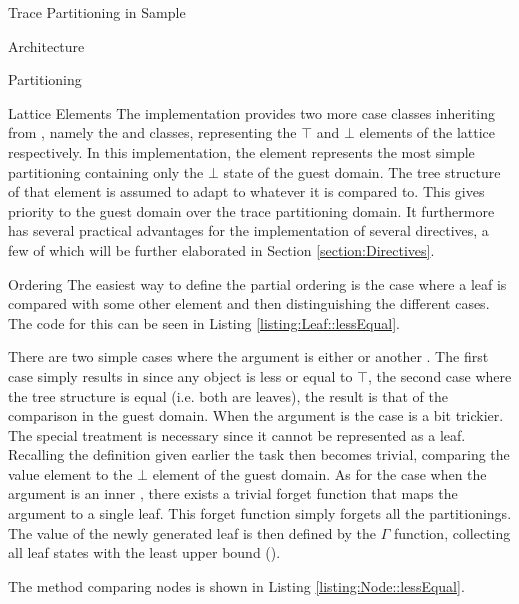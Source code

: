 \begin{chapter}{Trace Partitioning in Sample}
\begin{section}{Architecture}
\begin{subsection}{Partitioning}

			\begin{subsubsection}{Lattice Elements}
				The implementation provides two more case classes inheriting from , namely the  and  classes, representing the $\top$ and $\bot$ elements of the lattice respectively. In this implementation, the  element represents the most simple partitioning containing only the $\bot$ state of the guest domain. The tree structure of that element is assumed to adapt to whatever it is compared to. This gives priority to the guest domain over the trace partitioning domain. It furthermore has several practical advantages for the implementation of several directives, a few of which will be further elaborated in Section \ref{section:Directives}.
			\end{subsubsection}


			\begin{subsubsection}{Ordering}
				The easiest way to define the partial ordering is the case where a leaf is compared with some other element and then distinguishing the different cases. The code for this can be seen in Listing \ref{listing:Leaf::lessEqual}. 

				
				
				There are two simple cases where the argument is either  or another . The first case simply results in  since any object is less or equal to $\top$, the second case where the tree structure is equal (i.e. both are leaves), the result is that of the comparison in the guest domain. When the argument is  the case is a bit trickier. The special treatment is necessary since it cannot be represented as a leaf. Recalling the definition given earlier the task then becomes trivial, comparing the value element to the $\bot$ element of the guest domain. As for the case when the argument is an inner , there exists a trivial forget function that maps the argument to a single leaf. This forget function simply forgets all the partitionings. The value of the newly generated leaf is then defined by the $\Gamma$ function, collecting all leaf states with the least upper bound ().

				The method comparing nodes is shown in Listing \ref{listing:Node::lessEqual}. 


\end{subsubsection}
\end{subsection}
\end{section}
\end{chapter}
